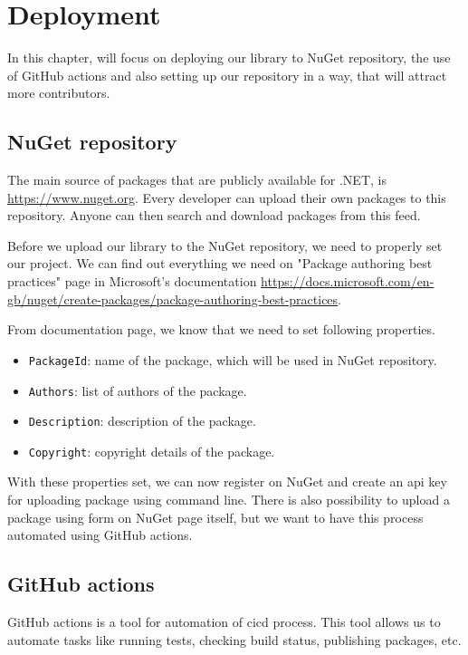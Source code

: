 \chapter {Deployment}

In this chapter, will focus on deploying our library to NuGet repository, the use of GitHub actions
and also setting up our repository in a way, that will attract more contributors.

\section {NuGet repository}

The main source of packages that are publicly available for .NET, is \url{https://www.nuget.org}. Every developer can
upload their own packages to this repository. Anyone can then search and download packages from this feed.

Before we upload our library to the NuGet repository, we need to properly set our project. We can find out
everything we need on "Package authoring best practices" page in Microsoft's documentation
\url{https://docs.microsoft.com/en-gb/nuget/create-packages/package-authoring-best-practices}.

From documentation page, we know that we need to set following properties.

\begin{itemize}
    \item \texttt{PackageId}: name of the package, which will be used in NuGet repository.
    \item \texttt{Authors}: list of authors of the package.
    \item \texttt{Description}: description of the package.
    \item \texttt{Copyright}: copyright details of the package.
\end{itemize}

With these properties set, we can now register on NuGet and create an \acrshort{api} key for uploading package
using command line. There is also possibility to upload a package using form on NuGet page itself, but we want to
have this process automated using GitHub actions.

\section{GitHub actions}

GitHub actions is a tool for automation of \acrfull{cicd} process. This tool allows us to automate tasks like
running tests, checking build status, publishing packages, etc.





